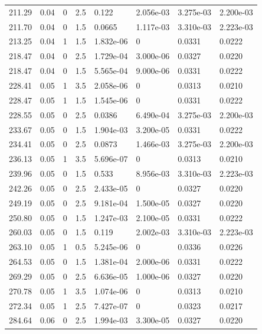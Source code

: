 \documentclass[preview]{standalone}
\begin{document}
{{{\begin{tabular}{L{1.2cm}C{1.2cm} C{0.3cm}C{0.5cm} C{1.4cm}C{1.4cm} C{1.4cm}C{1.4cm}}
  211.29  &  0.04  & 0     & 2.5 &  0.122  & 2.056e-03  & 3.275e-03 &  2.200e-03   \\ 
  211.70  &  0.04  & 0     & 1.5 &  0.0665  & 1.117e-03  & 3.310e-03 &  2.223e-03   \\ 
  213.25  &  0.04  & 1     & 1.5 &  1.832e-06  & 0  & 0.0331 &  0.0222   \\ 
  218.47  &  0.04  & 0     & 2.5 &  1.729e-04  & 3.000e-06  & 0.0327 &  0.0220   \\ 
  218.47  &  0.04  & 0     & 1.5 &  5.565e-04  & 9.000e-06  & 0.0331 &  0.0222   \\ 
  228.41  &  0.05  & 1     & 3.5 &  2.058e-06  & 0  & 0.0313 &  0.0210   \\ 
  228.47  &  0.05  & 1     & 1.5 &  1.545e-06  & 0  & 0.0331 &  0.0222   \\ 
  228.55  &  0.05  & 0     & 2.5 &  0.0386  & 6.490e-04  & 3.275e-03 &  2.200e-03   \\ 
  233.67  &  0.05  & 0     & 1.5 &  1.904e-03  & 3.200e-05  & 0.0331 &  0.0222   \\ 
  234.41  &  0.05  & 0     & 2.5 &  0.0873  & 1.466e-03  & 3.275e-03 &  2.200e-03   \\ 
  236.13  &  0.05  & 1     & 3.5 &  5.696e-07  & 0  & 0.0313 &  0.0210   \\ 
  239.96  &  0.05  & 0     & 1.5 &  0.533  & 8.956e-03  & 3.310e-03 &  2.223e-03   \\ 
  242.26  &  0.05  & 0     & 2.5 &  2.433e-05  & 0  & 0.0327 &  0.0220   \\ 
  249.19  &  0.05  & 0     & 2.5 &  9.181e-04  & 1.500e-05  & 0.0327 &  0.0220   \\ 
  250.80  &  0.05  & 0     & 1.5 &  1.247e-03  & 2.100e-05  & 0.0331 &  0.0222   \\ 
  260.03  &  0.05  & 0     & 1.5 &  0.119  & 2.002e-03  & 3.310e-03 &  2.223e-03   \\ 
  263.10  &  0.05  & 1     & 0.5 &  5.245e-06  & 0  & 0.0336 &  0.0226   \\ 
  264.53  &  0.05  & 0     & 1.5 &  1.381e-04  & 2.000e-06  & 0.0331 &  0.0222   \\ 
  269.29  &  0.05  & 0     & 2.5 &  6.636e-05  & 1.000e-06  & 0.0327 &  0.0220   \\ 
  270.78  &  0.05  & 1     & 3.5 &  1.074e-06  & 0  & 0.0313 &  0.0210   \\ 
  272.34  &  0.05  & 1     & 2.5 &  7.427e-07  & 0  & 0.0323 &  0.0217   \\ 
  284.64  &  0.06  & 0     & 2.5 &  1.994e-03  & 3.300e-05  & 0.0327 &  0.0220   \\ 

\end{tabular}}}}
\end{document}
